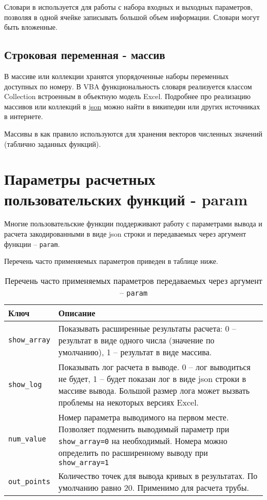 Словари в \unf{} используется для работы с набора входных и выходных параметров, позволяя в одной ячейке записывать большой объем информации. Словари могут быть вложенные.

\subsection{Строковая переменная - массив}
В массиве или коллекции хранятся упорядоченные наборы переменных доступных по номеру. В VBA функциональность словаря реализуется классом Collection встроенным в объектную модель Excel. Подробнее про реализацию массивов или коллекций в \href{https://ru.wikipedia.org/wiki/JSON}{json} можно найти в википедии или других источниках в интернете.

Массивы в \unf{} как правило используются для хранения векторов численных значений (таблично заданных функций).

\section{Параметры расчетных пользовательских функций - param}

Многие пользовательские функции \unf{} поддерживают работу с параметрами вывода и расчета закодированными в виде json строки и передаваемых через аргумент функции -- \texttt{param}.

Перечень часто применяемых параметров приведен в таблице ниже.

\begin{table}[H]
	\caption{Перечень часто применяемых параметров передаваемых через аргумент -- \texttt{param}}
	\label{table:param_list_0}
	\begin{tabular}{p{}p{}}
		\hline
		Ключ & Описание  \\ \hline
		\texttt{show_array} & Показывать расширенные результаты расчета: 0 -- результат в виде одного числа (значение по умолчанию), 1 -- результат в виде массива.    \\ \hline
		
		\texttt{show_log} & Показывать лог расчета в выводе. 0 -- лог выводиться не будет, 1 -- будет показан лог в виде json строки в массиве вывода. Большой размер лога может вызвать проблемы на некоторых версиях Excel.   \\ \hline
		
		\texttt{num_value} & Номер параметра выводимого на первом месте. Позволяет подменить выводимый параметр при \texttt{show_array=0} на необходимый. Номера можно определить по расширенному выводу при \texttt{show_array=1}  \\ \hline
		
		\texttt{out_points} & Количество точек для вывода кривых в результатах. По умолчанию равно 20. Применимо для расчета трубы.  \\ \hline
	\end{tabular}
\end{table}

